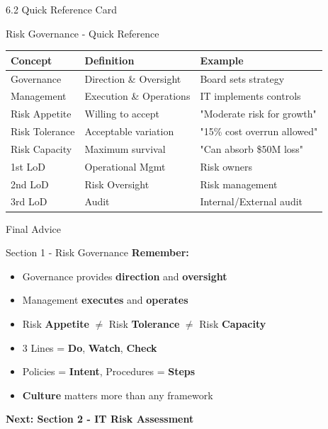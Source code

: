 \documentclass[10pt]{beamer}  %
\begin{document}
	\begin{frame}{6.2 Quick Reference Card}
		\begin{block}{Risk Governance - Quick Reference}
			\begin{tabular}{|p{3.5cm}|p{3cm}|p{3.5cm}|}
				\hline
				\textbf{Concept} & \textbf{Definition} & \textbf{Example} \\
				\hline
				Governance & Direction \& Oversight & Board sets strategy \\
				\hline
				Management & Execution \& Operations & IT implements controls \\
				\hline
				Risk Appetite & Willing to accept & "Moderate risk for growth" \\
				\hline
				Risk Tolerance & Acceptable variation & "15\% cost overrun allowed" \\
				\hline
				Risk Capacity & Maximum survival & "Can absorb \$50M loss" \\
				\hline
				1st LoD & Operational Mgmt & Risk owners \\
				\hline
				2nd LoD & Risk Oversight & Risk management \\
				\hline
				3rd LoD & Audit & Internal/External audit \\
				\hline
			\end{tabular}
		\end{block}
	\end{frame}
	
	\begin{frame}{Final Advice}
		\begin{block}{Section 1 - Risk Governance}
			\centering
			\vspace{0.3cm}
			\textbf{Remember:}
			\begin{itemize}
				\item Governance provides \textbf{direction} and \textbf{oversight}
				\item Management \textbf{executes} and \textbf{operates}
				\item Risk \textbf{Appetite} $\ne$ Risk \textbf{Tolerance} $\ne$ Risk \textbf{Capacity}
				\item 3 Lines = \textbf{Do}, \textbf{Watch}, \textbf{Check}
				\item Policies = \textbf{Intent}, Procedures = \textbf{Steps}
				\item \textbf{Culture} matters more than any framework
			\end{itemize}
			\vspace{0.5cm}
			\textbf{Next: Section 2 - IT Risk Assessment}
		\end{block}
	\end{frame}
	
	
\end{document}
